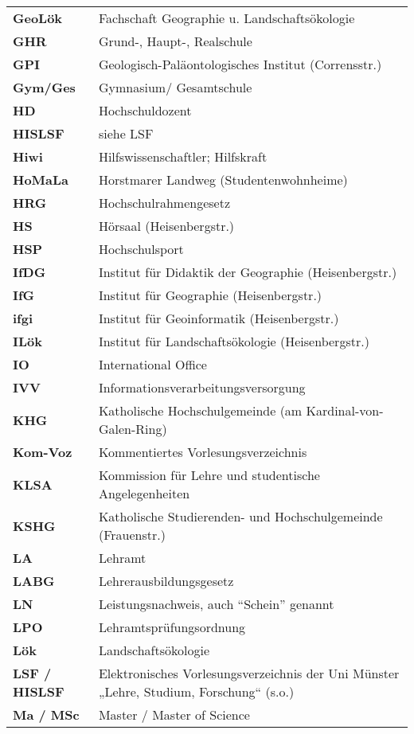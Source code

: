 \begin{longtable}{p{} p{}}
  \textbf{GeoLök} & Fachschaft Geographie u. Landschaftsökologie\\
  \textbf{GHR} & Grund-, Haupt-, Realschule\\
  \textbf{GPI} & Geologisch-Paläontologisches Institut (Corrensstr.)\\
  \textbf{Gym/Ges} & Gymnasium/ Gesamtschule\\
  \textbf{HD} & Hochschuldozent\\
  \textbf{HISLSF} & siehe LSF\\
  \textbf{Hiwi} & Hilfswissenschaftler; Hilfskraft\\
  \textbf{HoMaLa} & Horstmarer Landweg (Studentenwohnheime)\\
  \textbf{HRG} & Hochschulrahmengesetz\\
  \textbf{HS} & Hörsaal (Heisenbergstr.)\\
  \textbf{HSP} & Hochschulsport\\
  \textbf{IfDG} & Institut für Didaktik der Geographie (Heisenbergstr.)\\
  \textbf{IfG} & Institut für Geographie (Heisenbergstr.)\\
  \textbf{ifgi} & Institut für Geoinformatik (Heisenbergstr.)\\
  \textbf{ILök} & Institut für Landschaftsökologie (Heisenbergstr.)\\
  \textbf{IO} & International Office\\
  \textbf{IVV} & Informationsverarbeitungsversorgung\\
  \textbf{KHG} & Katholische Hochschulgemeinde (am Kardinal-von-Galen-Ring)\\
  \textbf{Kom-Voz} & Kommentiertes Vorlesungsverzeichnis\\
  \textbf{KLSA} & Kommission für Lehre und studentische Angelegenheiten\\
  \textbf{KSHG} & Katholische Studierenden- und Hochschulgemeinde (Frauenstr.)\\
  \textbf{LA} & Lehramt\\
  \textbf{LABG} & Lehrerausbildungsgesetz\\
  \textbf{LN} & Leistungsnachweis, auch "`Schein"' genannt\\
  \textbf{LPO} & Lehramtsprüfungsordnung\\
  \textbf{Lök} & Landschaftsökologie\\
  \textbf{LSF / HISLSF} & Elektronisches Vorlesungsverzeichnis der Uni Münster „Lehre, Studium, Forschung“ (s.o.)\\
  \textbf{Ma / MSc} & Master / Master of Science\\

\end{longtable}
